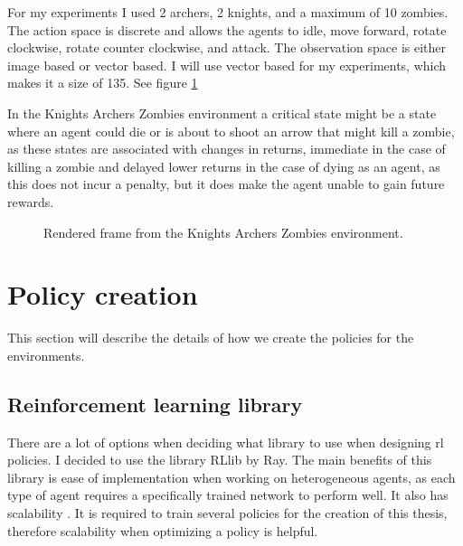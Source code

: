 \documentclass[UKenglish]{uiomasterthesis}
\begin{document}
For my experiments I used 2 archers, 2 knights, and a maximum of 10 zombies. The action space is discrete and allows the agents to idle, move forward, rotate clockwise, rotate counter clockwise, and attack. The observation space is either image based or vector based. I will use vector based for my experiments, which makes it a size of 135. See figure \ref{fig:kaz_env}

In the Knights Archers Zombies environment a critical state might be a state where an agent could die or is about to shoot an arrow that might kill a zombie, as these states are associated with changes in returns, immediate in the case of killing a zombie and delayed lower returns in the case of dying as an agent, as this does not incur a penalty, but it does make the agent unable to gain future rewards.

\begin{figure}[H]
    \centering
    \caption{Rendered frame from the Knights Archers Zombies environment.}
    \label{fig:kaz_env}
\end{figure}

\section{Policy creation}
This section will describe the details of how we create the policies for the environments.

\subsection{Reinforcement learning library}
There are a lot of options when deciding what library to use when designing \ac{rl} policies. I decided to use the library RLlib by Ray. The main benefits of this library is ease of implementation when working on heterogeneous agents, as each type of agent requires a specifically trained network to perform well. It also has scalability \cite{rayrllib}. It is required to train several policies for the creation of this thesis, therefore scalability when optimizing a policy is helpful.
\end{document}
